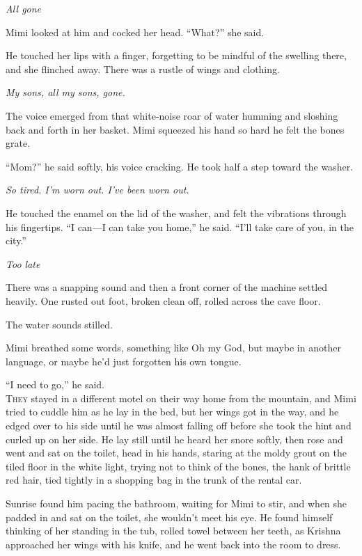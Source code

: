 \documentclass{article}
\begin{document}
\textit{All gone}

Mimi looked at him and cocked her head.  ``What?'' she said.

He touched her lips with a finger, forgetting to be mindful of the
swelling there, and she flinched away.  There was a rustle of wings
and clothing.

\textit{My sons, all my sons, gone.}

The voice emerged from that white-noise roar of water humming and
sloshing back and forth in her basket.  Mimi squeezed his hand so hard
he felt the bones grate.

``Mom?'' he said softly, his voice cracking.  He took half a step
toward the washer.

\textit{So tired.  I'm worn out.  I've been worn out.}

He touched the enamel on the lid of the washer, and felt the
vibrations through his fingertips.  ``I can---I can take you home,''
he said.  ``I'll take care of you, in the city.''

\textit{Too late}

There was a snapping sound and then a front corner of the machine
settled heavily.  One rusted out foot, broken clean off, rolled across
the cave floor.

The water sounds stilled.

Mimi breathed some words, something like Oh my God, but maybe in
another language, or maybe he'd just forgotten his own tongue.

``I need to go,'' he said.
\\
\lettrine[lines=3, lhang=.5, nindent=0pt, findent=2pt]{T}{hey} stayed in a different motel on their way home from the mountain,
and Mimi tried to cuddle him as he lay in the bed, but her wings got
in the way, and he edged over to his side until he was almost falling
off before she took the hint and curled up on her side.  He lay still
until he heard her snore softly, then rose and went and sat on the
toilet, head in his hands, staring at the moldy grout on the tiled
floor in the white light, trying not to think of the bones, the hank
of brittle red hair, tied tightly in a shopping bag in the trunk of
the rental car.

Sunrise found him pacing the bathroom, waiting for Mimi to stir, and
when she padded in and sat on the toilet, she wouldn't meet his eye. 
He found himself thinking of her standing in the tub, rolled towel
between her teeth, as Krishna approached her wings with his knife, and
he went back into the room to dress.
\end{document}
